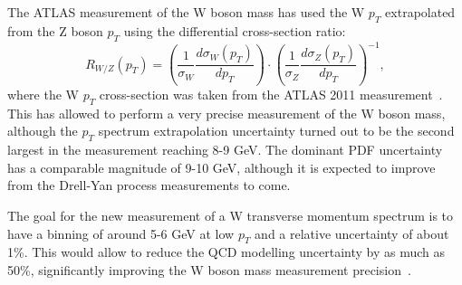 The ATLAS measurement of the W boson mass has used the W $p_T$ extrapolated from the Z boson $p_T$ using the differential cross-section ratio:
		\begin{equation}
R_{W/Z}(p_T)=\left(\frac{1}{\sigma_W} \frac{d\sigma_W(p_T)}{dp_T} \right)\cdot\left(\frac{1}{\sigma_Z} \frac{d\sigma_Z(p_T)}{dp_T} \right)^{-1},
\end{equation}	
where the W $p_T$ cross-section was taken from the ATLAS 2011 measurement~\cite{wpt_atlas}. This has allowed to perform a very precise measurement of the W boson mass, although the $p_T$ spectrum extrapolation uncertainty turned out to be the second largest in the measurement reaching 8-9 GeV. The dominant PDF uncertainty has a comparable magnitude of 9-10 GeV, although it is expected to improve from the Drell-Yan process measurements to come. 

The goal for the new measurement of a W transverse momentum spectrum is to have a binning of around 5-6 GeV at low $p_T$ and a relative uncertainty of about 1\%. This would allow to reduce the QCD modelling uncertainty by as much as 50\%, significantly improving the W boson mass measurement precision~\cite{wpt_prospects}.